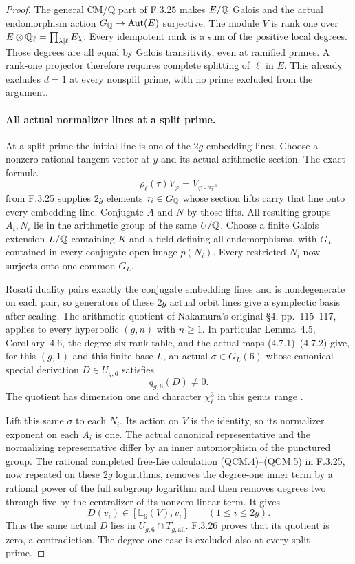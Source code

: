 \begin{proof}
The general CM/Q part of F.3.25 makes $E/\mathbb Q$
Galois and the actual endomorphism action
$G_{\mathbb Q}\to\operatorname{Aut}(E)$ surjective.
The module $V$ is rank one over
$E\otimes\mathbb Q_\ell=\prod_{\lambda\mid\ell}E_\lambda$.
Every idempotent rank is a sum of the positive
local degrees. Those degrees are all equal by
Galois transitivity, even at ramified primes.
A rank-one projector therefore requires complete
splitting of $\ell$ in $E$. This already excludes
$d=1$ at every nonsplit prime, with no prime
excluded from the argument.

\paragraph{All actual normalizer lines at a split prime.}
At a split prime the initial line is one of
the $2g$ embedding lines. Choose a nonzero
rational tangent vector at $y$ and its actual
arithmetic section. The exact formula
\[
 \rho_\ell(\tau)V_\varphi
          =V_{\varphi\circ a_\tau^{-1}}
\]
from F.3.25 supplies $2g$ elements $\tau_i\in G_{\mathbb Q}$
whose section lifts carry that line onto every
embedding line. Conjugate $A$ and $N$ by those
lifts. All resulting groups $A_i,N_i$ lie in
the arithmetic group of the same $U/\mathbb Q$.
Choose a finite Galois extension $L/\mathbb Q$ containing
$K$ and a field defining all endomorphisms, with
$G_L$ contained in every conjugate open image
$p(N_i)$. Every restricted $N_i$ now surjects
onto one common $G_L$.

Rosati duality pairs exactly the conjugate
embedding lines and is nondegenerate on each
pair, so generators of these $2g$ actual orbit
lines give a symplectic basis after scaling.
The arithmetic quotient of Nakamura's original
\S4, pp.~115--117, applies to every hyperbolic
$(g,n)$ with $n\geq1$. In particular Lemma~4.5,
Corollary~4.6, the degree-six rank table, and
the actual maps (4.7.1)--(4.7.2) give, for this
$(g,1)$ and this finite base $L$, an actual
$\sigma\in G_L(6)$ whose canonical special
derivation $D\in U_{g,6}$ satisfies
\[
                            q_{g,6}(D)\ne0.
\]
The quotient has dimension one and character
$\chi_\ell^3$ in this genus range
\cite[pp.~115--117]{AuditNakamura1996}.

Lift this same $\sigma$ to each $N_i$.
Its action on $V$ is the identity, so its
normalizer exponent on each $A_i$ is one.
The actual canonical representative and the
normalizing representative differ by an inner
automorphism of the punctured group. The rational
completed free-Lie calculation (QCM.4)--(QCM.5)
in F.3.25, now repeated on these $2g$ logarithms,
removes the degree-one inner term by a rational
power of the full subgroup logarithm and then
removes degrees two through five by the
centralizer of its nonzero linear term. It gives
\[
                         D(v_i)\in[\mathbb L_6(V),v_i]
                         \qquad(1\leq i\leq2g).
\]
Thus the same actual $D$ lies in
$U_{g,6}\cap T_{g,\mathrm{all}}$. F.3.26 proves
that its quotient is zero, a contradiction.
The degree-one case is excluded also at every
split prime.


\end{proof}
